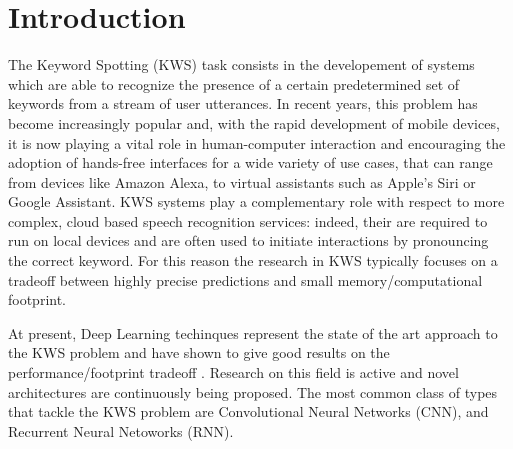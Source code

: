 
\section{Introduction}
\label{sec:introduction}
	
The Keyword Spotting (KWS) task consists in the developement of systems which are able to recognize the presence of a certain predetermined set of keywords from a stream of user utterances. In recent years, this problem has become increasingly popular and, with the rapid development of mobile devices, it is now playing a vital role in human-computer interaction and encouraging the adoption of hands-free interfaces for a wide variety of use cases, that can range from  devices like Amazon Alexa, to virtual assistants such as Apple's Siri or Google Assistant. KWS systems play a complementary role with respect to more complex, cloud based speech recognition services: indeed, their are required to run on local devices and are often used to initiate interactions by pronouncing the correct keyword. For this reason the research in KWS typically focuses on a tradeoff between highly precise predictions and small memory/computational footprint.

At present, Deep Learning techinques represent the state of the art approach to the KWS problem and have shown to give good results on the performance/footprint tradeoff \cite{chen2014dnns,Sainath2015ConvolutionalNN}. Research on this field is active and novel architectures are continuously being proposed. The most common class of types that tackle the KWS problem are Convolutional Neural Networks (CNN), and Recurrent Neural Netoworks (RNN).

